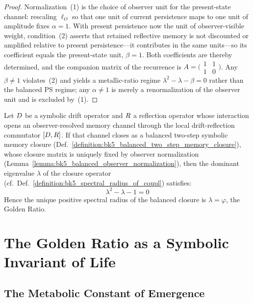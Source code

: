 \begin{proof}
\label{proof:bk5_balanced_observer_normalization}
Normalization~(1) is the choice of observer unit for the present-state channel:
rescaling $\ell_O$ so that one unit of current persistence maps to one unit of
amplitude fixes $\alpha=1$. With present persistence now the unit of
observer-visible weight, condition~(2) asserts that retained reflective memory is
not discounted or amplified relative to present persistence---it contributes in
the same units---so its coefficient equals the present-state unit, $\beta=1$.
Both coefficients are thereby determined, and the companion matrix of the
recurrence is $A=\big(\begin{smallmatrix}1&1\\1&0\end{smallmatrix}\big)$. Any
$\beta\neq 1$ violates~(2) and yields a metallic-ratio regime
$\lambda^2-\lambda-\beta=0$ rather than the balanced PS regime; any $\alpha\neq 1$
is merely a renormalization of the observer unit and is excluded by~(1).
\end{proof}

\begin{theorem}
\label{theorem:bk5_golden_ratio_spectral_invariant}
Let $D$ be a symbolic drift operator and $R$ a reflection operator
whose interaction opens an observer-resolved memory channel through the local
drift-reflection commutator $[D,R]$.  If that channel closes as a
balanced two-step symbolic memory closure
(Def.~\ref{definition:bk5_balanced_two_step_memory_closure}), whose closure matrix
is uniquely fixed by observer normalization
(Lemma~\ref{lemma:bk5_balanced_observer_normalization}), then the dominant
eigenvalue $\lambda$ of the closure operator (cf.~Def.~\ref{definition:bk5_spectral_radius_of_coupl}) satisfies:
\[
\lambda^2 - \lambda - 1 = 0
\]
Hence the unique positive spectral radius of the balanced closure is
$\lambda=\varphi$, the Golden Ratio.
\end{theorem}

\section{The Golden Ratio as a Symbolic Invariant of Life}
\label{sec:bk5_golden_ratio_invariant}

\subsection{The Metabolic Constant of Emergence}
\label{subsec:bk5_metabolic_constant_emergence}

